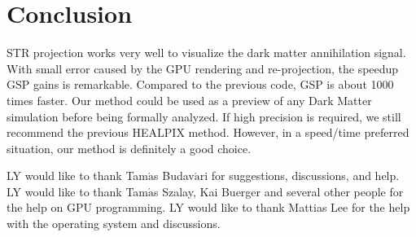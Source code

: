 \section{Conclusion}
STR projection works very well to visualize the dark matter annihilation signal. With small error caused by the GPU rendering and re-projection, the speedup GSP gains is remarkable. Compared to the previous code, GSP is about 1000 times faster. Our method could be used as a preview of any Dark Matter simulation before being formally analyzed. If high precision is required, we still recommend the previous HEALPIX method. However, in a speed/time preferred situation, our method is definitely a good choice. 

\acknowledgements LY would like to thank Tam$\mathrm{\acute{a}}$s Budav$\mathrm{\acute{a}}$ri for suggestions, discussions, and help. LY would like to thank Tam$\mathrm{\acute{a}}$s Szalay, Kai Buerger and several other people for the help on GPU programming. LY would like to thank Mattias Lee for the help with the operating system and discussions. 



